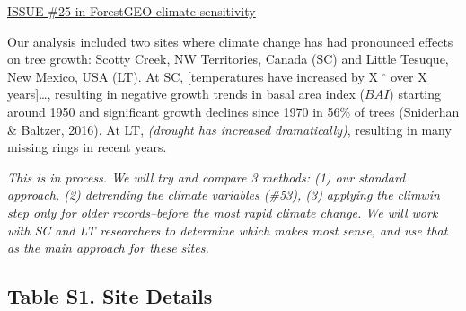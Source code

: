 \documentclass[
]{article}
\begin{document}
\href{https://github.com/EcoClimLab/ForestGEO-climate-sensitivity/issues/25}{ISSUE
\#25 in ForestGEO-climate-sensitivity}

Our analysis included two sites where climate change has had pronounced
effects on tree growth: Scotty Creek, NW Territories, Canada (SC) and
Little Tesuque, New Mexico, USA (LT). At SC, {[}temperatures have
increased by X \(^\circ\) over X years{]}\ldots, resulting in negative
growth trends in basal area index (\(BAI\)) starting around 1950 and
significant growth declines since 1970 in 56\% of trees (Sniderhan \&
Baltzer, 2016). At LT, \emph{(drought has increased dramatically)},
resulting in many missing rings in recent years.

\emph{This is in process. We will try and compare 3 methods: (1) our
standard approach, (2) detrending the climate variables (\#53), (3)
applying the climwin step only for older records--before the most rapid
climate change. We will work with SC and LT researchers to determine
which makes most sense, and use that as the main approach for these
sites.}

\newpage

\hypertarget{table-s1.-site-details}{%
\subsection{Table S1. Site Details}\label{table-s1.-site-details}}
\end{document}
